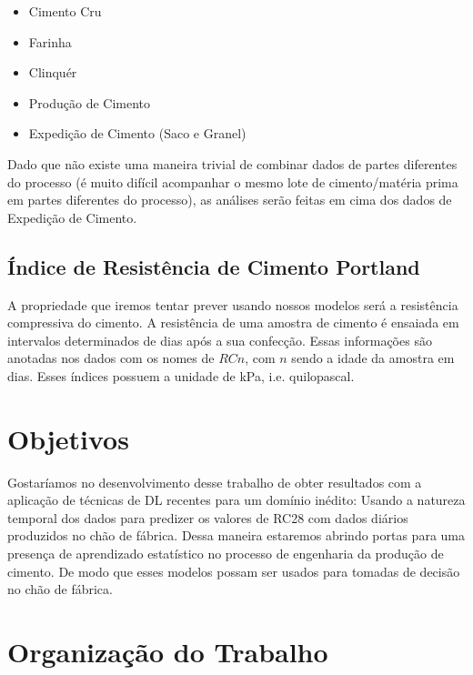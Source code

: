 \begin{itemize}
        \item Cimento Cru
        \item Farinha
        \item Clinquér
        \item Produção de Cimento
        \item Expedição de Cimento (Saco e Granel)
\end{itemize}

Dado que não existe uma maneira trivial de combinar dados de partes diferentes do processo (é muito difícil acompanhar o mesmo lote de cimento/matéria prima em partes diferentes do processo), as análises serão feitas em cima dos dados de Expedição de Cimento.

\subsection{Índice de Resistência de Cimento Portland}
\label{sec:rc}
A propriedade que iremos tentar prever usando nossos modelos será a resistência
compressiva do cimento. A resistência de uma amostra de cimento é ensaiada em
intervalos determinados de dias após a sua confecção. Essas informações são
anotadas nos dados com os nomes de $RCn$, com $n$ sendo a idade da amostra em
dias. Esses índices possuem a unidade de kPa, i.e. quilopascal.

\section{Objetivos}
\label{sec:objetivo}

Gostaríamos no desenvolvimento desse trabalho de obter resultados com a
aplicação de técnicas de DL recentes para um domínio inédito: Usando a
natureza temporal dos dados para predizer os valores de RC28 com dados diários
produzidos no chão de fábrica. Dessa maneira
estaremos abrindo portas para uma presença de aprendizado estatístico no processo de
engenharia da produção de cimento. De modo que esses modelos possam ser usados para tomadas de decisão no chão de fábrica.


\section{Organização do Trabalho}
\label{sec:organizacao_trabalho}

